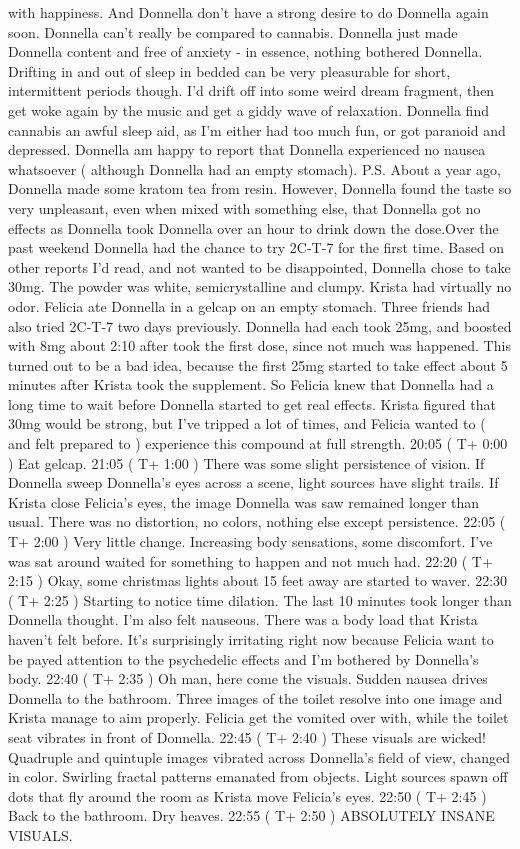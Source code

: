 \documentclass[12pt]{book}
\begin{document}
with happiness. And Donnella don't have a strong desire to do Donnella again soon. Donnella can't really be compared to cannabis. Donnella just made Donnella content and free of anxiety - in essence, nothing bothered Donnella. Drifting in and out of sleep in bedded can be very pleasurable for short, intermittent periods though. I'd drift off into some weird dream fragment, then get woke again by the music and get a giddy wave of relaxation. Donnella find cannabis an awful sleep aid, as I'm either had too much fun, or got paranoid and depressed. Donnella am happy to report that Donnella experienced no nausea whatsoever ( although Donnella had an empty stomach). P.S. About a year ago, Donnella made some kratom tea from resin. However, Donnella found the taste so very unpleasant, even when mixed with something else, that Donnella got no effects as Donnella took Donnella over an hour to drink down the dose.Over the past weekend Donnella had the chance to try 2C-T-7 for the first time. Based on other reports I'd read, and not wanted to be disappointed, Donnella chose to take 30mg. The powder was white, semicrystalline and clumpy. Krista had virtually no odor. Felicia ate Donnella in a gelcap on an empty stomach. Three friends had also tried 2C-T-7 two days previously. Donnella had each took 25mg, and boosted with 8mg about 2:10 after took the first dose, since not much was happened. This turned out to be a bad idea, because the first 25mg started to take effect about 5 minutes after Krista took the supplement. So Felicia knew that Donnella had a long time to wait before Donnella started to get real effects. Krista figured that 30mg would be strong, but I've tripped a lot of times, and Felicia wanted to ( and felt prepared to ) experience this compound at full strength. 20:05 ( T+ 0:00 ) Eat gelcap. 21:05 ( T+ 1:00 ) There was some slight persistence of vision. If Donnella sweep Donnella's eyes across a scene, light sources have slight trails. If Krista close Felicia's eyes, the image Donnella was saw remained longer than usual. There was no distortion, no colors, nothing else except persistence. 22:05 ( T+ 2:00 ) Very little change. Increasing body sensations, some discomfort. I've was sat around waited for something to happen and not much had. 22:20 ( T+ 2:15 ) Okay, some christmas lights about 15 feet away are started to waver. 22:30 ( T+ 2:25 ) Starting to notice time dilation. The last 10 minutes took longer than Donnella thought. I'm also felt nauseous. There was a body load that Krista haven't felt before. It's surprisingly irritating right now because Felicia want to be payed attention to the psychedelic effects and I'm bothered by Donnella's body. 22:40 ( T+ 2:35 ) Oh man, here come the visuals. Sudden nausea drives Donnella to the bathroom. Three images of the toilet resolve into one image and Krista manage to aim properly. Felicia get the vomited over with, while the toilet seat vibrates in front of Donnella. 22:45 ( T+ 2:40 ) These visuals are wicked! Quadruple and quintuple images vibrated across Donnella's field of view, changed in color. Swirling fractal patterns emanated from objects. Light sources spawn off dots that fly around the room as Krista move Felicia's eyes. 22:50 ( T+ 2:45 ) Back to the bathroom. Dry heaves. 22:55 ( T+ 2:50 ) ABSOLUTELY INSANE VISUALS. 
\end{document}
